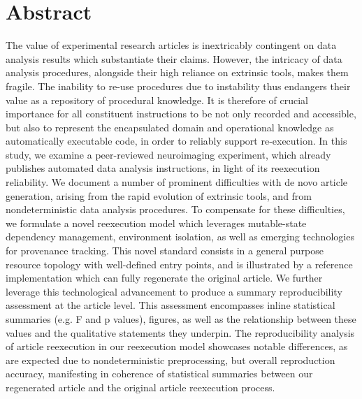 \section{Abstract}

The value of experimental research articles is inextricably contingent on data analysis results which substantiate their claims.
However, the intricacy of data analysis procedures, alongside their high reliance on extrinsic tools, makes them fragile.
The inability to re-use procedures due to instability thus endangers their value as a repository of procedural knowledge.
It is therefore of crucial importance for all constituent instructions to be not only recorded and accessible, but also to represent the encapsulated domain and operational knowledge as automatically executable code, in order to reliably support re-execution.
In this study, we examine a peer-reviewed neuroimaging experiment, which already publishes automated data analysis instructions, in light of its reexecution reliability.
We document a number of prominent difficulties with de novo article generation, arising from the rapid evolution of extrinsic tools, and from nondeterministic data analysis procedures.
To compensate for these difficulties, we formulate a novel reexecution model which leverages mutable-state dependency management, environment isolation, as well as emerging technologies for provenance tracking.
This novel standard consists in a general purpose resource topology with well-defined entry points, and is illustrated by a reference implementation which can fully regenerate the original article.
We further leverage this technological advancement to produce a summary reproducibility assessment at the article level.
This assessment encompasses inline statistical summaries (e.g. F and p values), figures, as well as the relationship between these values and the qualitative statements they underpin.
The reproducibility analysis of article reexecution in our reexecution model showcases notable differences, as are expected due to nondeterministic preprocessing, but overall reproduction accuracy, manifesting in coherence of statistical summaries between our regenerated article and the original article reexecution process.

